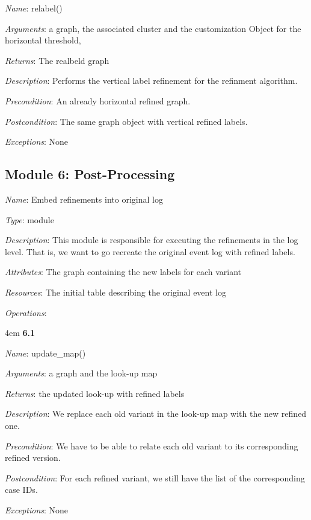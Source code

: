 \documentclass[notitlepage]{article}
\begin{document}
\begin{flushleft}
\textit{Name}: relabel()

\textit{Arguments}: a graph, the associated cluster and the customization Object for the horizontal threshold, 

\textit{Returns}: The realbeld graph

\textit{Description}: Performs the vertical label refinement for the refinment algorithm.

\textit{Precondition}: An already horizontal refined graph.

\textit{Postcondition}: The same graph object with vertical refined labels.

\textit{Exceptions}: None
\par
\endgroup




\subsection{Module 6: Post-Processing}
\textit{Name}: Embed refinements into original log 

\textit{Type}: module

\textit{Description}: This module is responsible for executing the refinements in the log level. That is, we want to go recreate the original event log with refined labels.

\textit{Attributes}: The graph containing the new labels for each variant

\textit{Resources}: The initial table describing the original event log

\textit{Operations}: 
\medskip

\par
\begingroup
\leftskip4em
\textbf{6.1} 

\textit{Name}: update\_map()

\textit{Arguments}: a graph and the look-up map

\textit{Returns}: the updated look-up with refined labels

\textit{Description}: We replace each old variant in the look-up map with the new refined one.

\textit{Precondition}: We have to be able to relate each old variant to its corresponding refined version.

\textit{Postcondition}: For each refined variant, we still have the list of the corresponding case IDs.

\textit{Exceptions}: None
\par
\endgroup



\end{flushleft}
\end{document}
